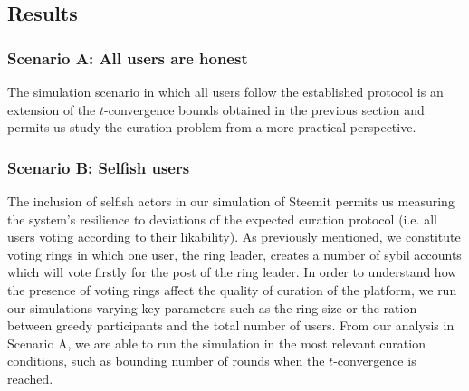 \subsection{Results}

\subsubsection*{Scenario A: All users are honest}

The simulation scenario in which all users follow the established protocol is an extension of the $t$-convergence bounds obtained in the previous section and permits us study the curation problem from a more practical perspective.


\subsubsection{Scenario B: Selfish users}

The inclusion of selfish actors in our simulation of Steemit permits us measuring the system's resilience to deviations of the expected curation protocol (i.e. all users voting according to their likability).
As previously mentioned, we constitute voting rings in which one user, the ring leader, creates a number of sybil accounts which will vote firstly for the post of the ring leader.
In order to understand how the presence of voting rings affect the quality of curation of the platform, we run our simulations varying key parameters such as the ring size or the ration between greedy participants and the total number of users.
From our analysis in Scenario A, we are able to run the simulation in the most relevant curation conditions, such as bounding number of rounds when the $t$-convergence is reached.











